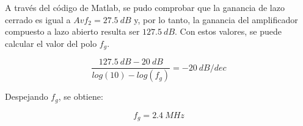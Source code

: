 \hspace{1mm} A través del código de Matlab, se pudo comprobar que la ganancia de lazo cerrado es igual a \(Avf_2=27.5~dB\) y, por lo tanto, la ganancia del amplificador compuesto a lazo abierto resulta ser \(127.5~dB\). Con estos valores, se puede calcular el valor del polo \(f_g\).

\begin{equation}
    \frac{127.5~dB-20~dB}{log(10)-log(f_g)}=-20~dB/dec
\end{equation}

\bigskip
\hspace{1mm} Despejando \(f_g\), se obtiene:

\begin{equation}
    f_g=2.4~MHz
\end{equation}
